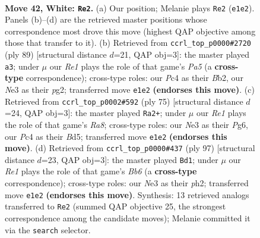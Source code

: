 \documentclass[11pt]{article}
\begin{document}
\clearpage

\begin{figure}[p]\centering
\begin{subfigure}{0.46\textwidth}\centering
\resizebox{\linewidth}{!}{%
\newchessgame
\chessboard[
  setfen={7k/1r4b1/R7/8/2P5/4N2K/8/4R3 w - - 4 42},
  showmover=false,
  pgfstyle=straightmove, color=movearrow, markmove={e1-e2}
]}
\caption{}
\end{subfigure}\hfill
\begin{subfigure}{0.46\textwidth}\centering
\resizebox{\linewidth}{!}{%
\newchessgame
\chessboard[
  setfen={8/6k1/2r5/7R/p7/3B4/1b2K1P1/8 b - - 3 45},
  showmover=false,
  pgfstyle=straightmove, color=movearrow, markmove={a4-a3}
]}
\caption{}
\end{subfigure}
\\[4pt]
\begin{subfigure}{0.46\textwidth}\centering
\resizebox{\linewidth}{!}{%
\newchessgame
\chessboard[
  setfen={8/8/5kp1/3b4/8/4R1B1/5K1P/r7 b - - 7 38},
  showmover=false,
  pgfstyle=straightmove, color=movearrow, markmove={a1-a2}
]}
\caption{}
\end{subfigure}\hfill
\begin{subfigure}{0.46\textwidth}\centering
\resizebox{\linewidth}{!}{%
\newchessgame
\chessboard[
  setfen={8/8/4k3/1r6/3B1R2/1b2K3/7P/8 b - - 6 49},
  showmover=false,
  pgfstyle=straightmove, color=movearrow, markmove={b3-d1}
]}
\caption{}
\end{subfigure}
\caption{\textbf{Move 42, White: \texttt{Re2}.} (a) Our position; Melanie plays \texttt{Re2} (\texttt{e1e2}). Panels (b)--(d) are the retrieved master positions whose correspondence most drove this move (highest QAP objective among those that transfer to it). (b) Retrieved from \texttt{ccrl\_top\_p0000\#2720} (ply 89) [structural distance $d$=21, QAP obj=3]: the master played \texttt{a3}; under $\mu$ our \emph{Re1} plays the role of that game's \emph{Pa5} (a \textbf{cross-type} correspondence); cross-type roles: our \emph{P}c4 as their \emph{B}b2, our \emph{N}e3 as their \emph{p}g2; transferred move \texttt{e1e2} \textbf{(endorses this move)}. (c) Retrieved from \texttt{ccrl\_top\_p0002\#592} (ply 75) [structural distance $d$=24, QAP obj=3]: the master played \texttt{Ra2+}; under $\mu$ our \emph{Re1} plays the role of that game's \emph{Ra8}; cross-type roles: our \emph{N}e3 as their \emph{P}g6, our \emph{P}c4 as their \emph{B}d5; transferred move \texttt{e1e2} \textbf{(endorses this move)}. (d) Retrieved from \texttt{ccrl\_top\_p0000\#437} (ply 97) [structural distance $d$=23, QAP obj=3]: the master played \texttt{Bd1}; under $\mu$ our \emph{Re1} plays the role of that game's \emph{Bb6} (a \textbf{cross-type} correspondence); cross-type roles: our \emph{N}e3 as their \emph{p}h2; transferred move \texttt{e1e2} \textbf{(endorses this move)}. Synthesis: 13 retrieved analogs transferred to \texttt{Re2} (summed QAP objective 25, the strongest correspondence among the candidate moves); Melanie committed it via the \texttt{search} selector.}
\label{fig:thought-m82}
\end{figure}
\end{document}
